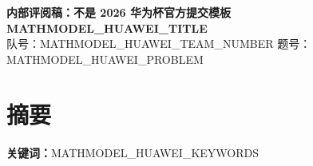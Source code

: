 \documentclass[12pt,a4paper]{ctexart}
\begin{document}
\begin{center}
{\color{red}\bfseries 内部评阅稿：不是 2026 华为杯官方提交模板}\\[1em]
{\Large\bfseries MATHMODEL_HUAWEI_TITLE}\\[0.5em]
队号：MATHMODEL_HUAWEI_TEAM_NUMBER\quad
题号：MATHMODEL_HUAWEI_PROBLEM
\end{center}

\section*{摘要}

\textbf{关键词：}MATHMODEL_HUAWEI_KEYWORDS









\appendix
\end{document}
